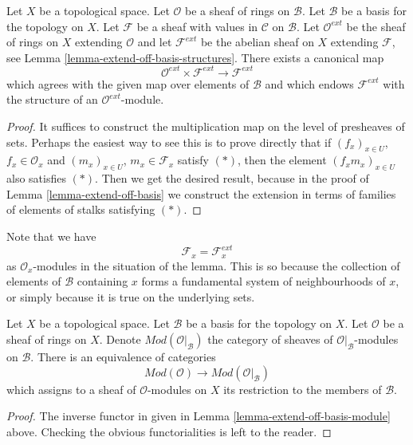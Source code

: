 \begin{lemma}
\label{lemma-extend-off-basis-module}
Let $X$ be a topological space. Let $\mathcal{O}$
be a sheaf of rings on $\mathcal{B}$.
Let $\mathcal{B}$ be a basis for the topology on $X$.
Let $\mathcal{F}$ be a sheaf with values in $\mathcal{C}$
on $\mathcal{B}$. Let $\mathcal{O}^{ext}$ be the sheaf
of rings on $X$ extending $\mathcal{O}$ and let
$\mathcal{F}^{ext}$ be the abelian sheaf on $X$ extending 
$\mathcal{F}$, see Lemma \ref{lemma-extend-off-basis-structures}.
There exists a canonical map
$$
\mathcal{O}^{ext} \times \mathcal{F}^{ext}
\longrightarrow
\mathcal{F}^{ext}
$$
which agrees with the given map over elements of $\mathcal{B}$
and which endows $\mathcal{F}^{ext}$ with the structure
of an $\mathcal{O}^{ext}$-module.
\end{lemma}

\begin{proof}
It suffices to construct the multiplication map
on the level of presheaves of sets. Perhaps the easiest
way to see this is to prove directly that if
$(f_x)_{x \in U}$, $f_x \in \mathcal{O}_x$
and
$(m_x)_{x \in U}$, $m_x \in \mathcal{F}_x$
satisfy $(*)$, then the element 
$(f_xm_x)_{x \in U}$ also satisfies $(*)$.
Then we get the desired result, because in the proof
of Lemma \ref{lemma-extend-off-basis} we construct the extension 
in terms of families of elements of stalks satisfying $(*)$.
\end{proof}

\noindent
Note that we have
$$
\mathcal{F}_x = \mathcal{F}_x^{ext}
$$
as $\mathcal{O}_x$-modules in the situation of the lemma.
This is so because the collection of elements of $\mathcal{B}$ containing
$x$ forms a fundamental system of neighbourhoods of $x$, or simply because
it is true on the underlying sets.

\begin{lemma}
\label{lemma-restrict-basis-equivalence-modules}
Let $X$ be a topological space.
Let $\mathcal{B}$ be a basis for the topology on $X$.
Let $\mathcal{O}$ be a sheaf of rings on $X$.
Denote $\textit{Mod}(\mathcal{O}|_\mathcal{B})$ the category of
sheaves of $\mathcal{O}|_{\mathcal{B}}$-modules on $\mathcal{B}$.
There is an equivalence of categories
$$
\textit{Mod}(\mathcal{O})
\longrightarrow
\textit{Mod}(\mathcal{O}|_\mathcal{B})
$$
which assigns to a sheaf of $\mathcal{O}$-modules on $X$ its restriction to
the members of $\mathcal{B}$.
\end{lemma}

\begin{proof}
The inverse functor in given in
Lemma \ref{lemma-extend-off-basis-module} above.
Checking the obvious functorialities is left to the reader.
\end{proof}

